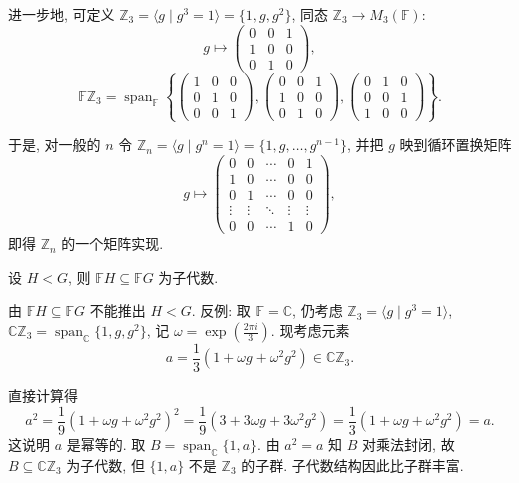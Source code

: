 进一步地, 可定义 $\mathbb{Z}_3=\langle g \mid g^3=1\rangle=\{1,g,g^2\}$, 同态 $\mathbb{Z}_3\to M_3(\mathbb{F})$:
\[
  g\longmapsto \begin{pmatrix}0&0&1\\1&0&0\\0&1&0\end{pmatrix},
\]
\[
  \mathbb{F}\mathbb{Z}_3=\operatorname{span}_{\mathbb{F}}\left\{
  \begin{pmatrix}1&0&0\\0&1&0\\0&0&1\end{pmatrix},
  \begin{pmatrix}0&0&1\\1&0&0\\0&1&0\end{pmatrix},
  \begin{pmatrix}0&1&0\\0&0&1\\1&0&0\end{pmatrix}\right\}.
\]

于是, 对一般的 $n$ 令 $\mathbb{Z}_n=\langle g \mid g^n=1\rangle=\{1,g,\dots,g^{n-1}\}$, 并把 $g$ 映到循环置换矩阵
\[
  g\longmapsto
  \begin{pmatrix}
    0&0&\cdots&0&1\\
    1&0&\cdots&0&0\\
    0&1&\cdots&0&0\\
    \vdots&\vdots&\ddots&\vdots&\vdots\\
    0&0&\cdots&1&0
  \end{pmatrix},
\]
即得 $\mathbb{Z}_n$ 的一个矩阵实现.

\begin{example}[子群代数]\label{ex:subgroup-algebra}
设 $H<G$, 则 $\mathbb{F}H\subseteq \mathbb{F}G$ 为子代数.
\end{example}

\begin{remark}\label{rem:subalgebra-not-subgroup}
由 $\mathbb{F}H\subseteq \mathbb{F}G$ 不能推出 $H<G$. 反例: 取 $\mathbb{F}=\mathbb{C}$, 仍考虑
$\mathbb{Z}_3=\langle g \mid g^3=1\rangle$, $\mathbb{C}\mathbb{Z}_3=\operatorname{span}_{\mathbb{C}}\{1,g,g^2\}$,
记 $\omega=\exp\left(\frac{2\pi i}{3}\right)$.
现考虑元素
\[
  a=\frac{1}{3}\left(1+\omega g+\omega^2 g^2\right)\in\mathbb{C}\mathbb{Z}_3 .
\]

直接计算得
\[
  a^2=\frac{1}{9}\left(1+\omega g+\omega^2 g^2\right)^2
  =\frac{1}{9}\left(3+3\omega g+3\omega^2 g^2\right)
  =\frac{1}{3}\left(1+\omega g+\omega^2 g^2\right)=a .
\]
这说明 $a$ 是幂等的. 取 $B=\operatorname{span}_{\mathbb{C}}\{1,a\}$. 由 $a^2=a$ 知 $B$ 对乘法封闭,
故 $B\subseteq\mathbb{C}\mathbb{Z}_3$ 为子代数, 但 $\{1,a\}$ 不是 $\mathbb{Z}_3$ 的子群.
子代数结构因此比子群丰富.
\end{remark}

